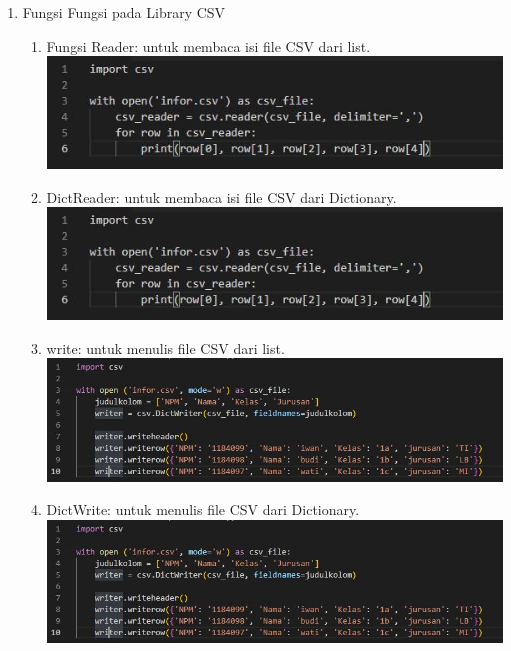 \begin{enumerate}
\item Fungsi Fungsi pada Library CSV\\
\begin{enumerate}
\item Fungsi Reader: untuk membaca isi file CSV dari list.\\
\includegraphics[scale = 0.7]{gambar/csv3.jpg}

\item DictReader: untuk membaca isi file  CSV dari Dictionary.\\
\includegraphics[scale = 0.7]{gambar/csv3.jpg}

\item write: untuk menulis file  CSV dari list.\\
\includegraphics[scale = 0.5]{gambar/csv4.jpg}

\item DictWrite: untuk menulis file CSV dari Dictionary.\\
\includegraphics[scale = 0.5]{gambar/csv4.jpg}
\end{enumerate}


\end{enumerate}
